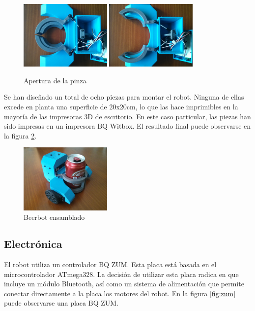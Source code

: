 \begin{figure}[H]
        \centering
        \includegraphics[width=0.4\textwidth]{images/pinzacerrada.jpg}
        \includegraphics[width=0.4\textwidth]{images/pinzaabierta.jpg}
        \caption{Apertura de la pinza}
        \label{fig:pinza}
\end{figure}

Se han diseñado un total de ocho piezas para montar el robot. Ninguna de ellas excede en planta una superficie de 20x20cm, lo que las hace imprimibles en la mayoría de las impresoras 3D de escritorio. En este caso particular, las piezas han sido impresas en un impresora BQ Witbox. El resultado final puede observarse en la figura \ref{fig:beerbot}.

\begin{figure}[H]
        \centering
        \includegraphics[width=0.4\textwidth]{images/beerbot.png}
        \caption{Beerbot ensamblado}
        \label{fig:beerbot}
\end{figure} 

\subsection{Electrónica}

El robot utiliza un controlador BQ ZUM. Esta placa está basada en el microcontrolador ATmega328. La decisión de utilizar esta placa radica en que incluye un módulo Bluetooth, así como un sistema de alimentación que permite conectar directamente a la placa los motores del robot. En la figura \ref{fig:zum} puede observarse una placa BQ ZUM.

